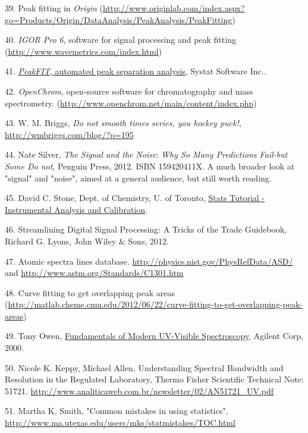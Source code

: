 39. Peak fitting in \textit{Origin} (\url{http://www.originlab.com/index.aspx?go=Products/Origin/DataAnalysis/PeakAnalysis/PeakFitting}) 

40. \textit{IGOR Pro 6}, software for signal processing and peak fitting (\url{http://www.wavemetrics.com/index.html})

41. \href{https://www.bioprocessonline.com/doc/software-for-automated-peak-separation-and-an-0001}{\textit{PeakFIT}, automated peak separation analysis}, Systat Software Inc..

42. \textit{OpenChrom}, open-source software for chromatography and mass spectrometry. (\url{http://www.openchrom.net/main/content/index.php})

43. W. M. Briggs, \textit{Do not smooth times series, you hockey puck!}, \url{http://wmbriggs.com/blog/?p=195}

44. Nate Silver, \textit{The Signal and the Noise}: \textit{Why So Many Predictions Fail-but Some Do not}, Penguin Press, 2012. ISBN 159420411X. A much broader look at "signal" and "noise", aimed at a general audience, but still worth reading.

45. David C. Stone, Dept. of Chemistry, U. of Toronto, \href{http://www.chem.utoronto.ca/coursenotes/analsci/stats/index.html}{Stats Tutorial - Instrumental Analysis and Calibration}.

46. Streamlining Digital Signal Processing: A Tricks of the Trade Guidebook, Richard G. Lyons, John Wiley \& Sons, 2012. 

47. Atomic spectra lines database. \url{http://physics.nist.gov/PhysRefData/ASD/} and \url{http://www.astm.org/Standards/C1301.htm}

48. Curve fitting to get overlapping peak areas (\href{http://matlab.cheme.cmu.edu/2012/06/22/curve-fitting-to-get-overlapping-peak-areas/\#13}{http://matlab.cheme.cmu.edu/2012/06/22/curve-fitting-to-get-overlapping-peak-areas})

49. Tony Owen, \href{http://www.chem.agilent.com/Library/primers/Public/59801397\_020660.pdf}{Fundamentals of Modern UV-Visible Spectroscopy}, Agilent Corp, 2000. 

50. Nicole K. Keppy, Michael Allen, Understanding Spectral Bandwidth and Resolution in the Regulated Laboratory, Thermo Fisher Scientific Technical Note: 51721. \url{http://www.analiticaweb.com.br/newsletter/02/AN51721_UV.pdf}

51. Martha K. Smith, "Common mistakes in using statistics", \url{http://www.ma.utexas.edu/users/mks/statmistakes/TOC.html}

